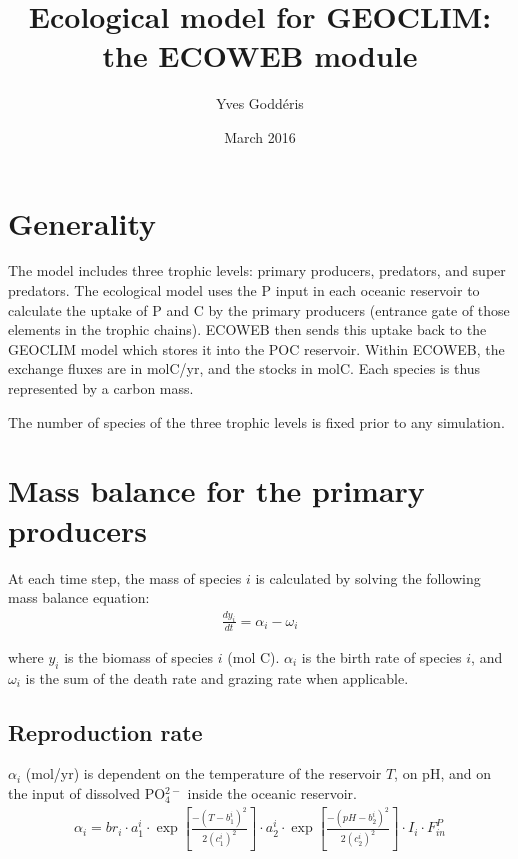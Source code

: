 \documentclass[11pt, oneside]{article}   	%
\title{Ecological model for GEOCLIM: the ECOWEB module}
\author{Yves Godd\'eris}
\date{March 2016}							%
\begin{document}
\maketitle


\section{Generality}
The model includes three trophic levels: primary producers, predators, and super predators. The ecological model uses the P input in each oceanic reservoir to calculate the uptake of P and C by the primary producers (entrance gate of those elements in the trophic chains). ECOWEB then sends this uptake back to the GEOCLIM model which stores it into the POC reservoir. Within ECOWEB, the exchange fluxes are in molC/yr, and the stocks in molC. Each species is thus represented by a carbon mass.

The number of species of the three trophic levels is fixed prior to any simulation.

\section{Mass balance for the primary producers}
At each time step, the mass of species $i$ is calculated by solving the following mass balance equation:
\begin{eqnarray}
\frac{dy_{i}}{dt}=\alpha_{i}-\omega_{i}
\label{spbalance}
\end{eqnarray}

where $y_i$ is the biomass of species $i$ (mol C). $\alpha_i$ is the birth rate of species $i$, and $\omega_i$ is the sum of the death rate and grazing rate when applicable.
\subsection{Reproduction rate}
$\alpha_i$ (mol/yr) is dependent on the temperature of the reservoir $T$, on pH, and on the input of dissolved PO$_{4}^{2-}$ inside the oceanic reservoir.
\\
\begin{eqnarray}
\alpha_{i}=br_{i} \cdot a_{1}^{i} \cdot \exp{\left[   \frac {-\left(T-b_{1}^{i}\right)^{2}}   {2\left(c_{1}^{i}\right)^{2}}  \right]} \cdot 
         a_{2}^{i} \cdot \exp{\left[   \frac {-\left(pH-b_{2}^{i}\right)^{2}}   {2\left(c_{2}^{i}\right)^{2}}  \right]} \cdot 
        I_{i} \cdot F_{in}^{P}
\label{birth}
\end{eqnarray}
\end{document}
